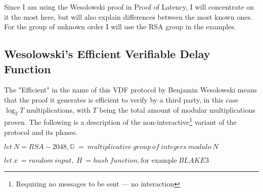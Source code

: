 
Since I am using the Wesolowski proof in Proof of Latency, I will concentrate on it the most here, but will also explain differences between the most known ones. For the group of unknown order I will use the RSA group in the examples.

\subsection{Wesolowski's Efficient Verifiable Delay Function}
The "Efficient" in the name of this VDF protocol by Benjamin Wesolowski means that the proof it generates is efficient to verify by a third party, in this case \( \log _{2} T \) multiplications, with \( T \) being the total amount of modular multiplications proven. The following is a description of the non-interactive\footnote{Requiring no messages to be sent --- no interaction} variant of the protocol and its phases.

\( let \: N = RSA-2048, \mathbb{G} \; = \: multiplicative \: group \: of \: integers \: modulo \: N \)

\( let \: x \: = random \: input,  \: H \: = hash \: function, \text{for example} \: BLAKE3 \)

